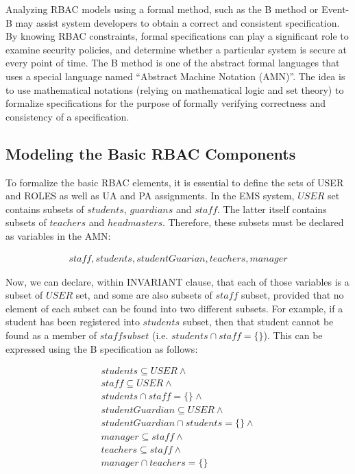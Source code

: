      Analyzing RBAC models using a formal method, such as the B method or Event-B may assist system developers to obtain a correct and consistent specification.  By knowing RBAC constraints, formal specifications can play a significant role to examine security policies, and determine whether a particular system is secure at every point of time.
The B method is one of the abstract formal languages that uses a special language named “Abstract Machine Notation (AMN)”.  The idea is to use mathematical notations (relying on mathematical logic and set theory) to formalize specifications for the purpose of formally verifying correctness and consistency of a specification.

\subsection{Modeling the Basic RBAC Components}

To formalize the basic RBAC elements, it is essential to define the sets of USER and ROLES as well as UA and PA assignments.  In the EMS system, $USER$ set contains subsets of $students$, $guardians$ and $staff$.  The latter itself contains subsets of $teachers$ and $headmasters$.  Therefore, these subsets must be declared as variables in the AMN: 

\begin{align*}
staff, students, studentGuarian, teachers, manager
\end{align*}


Now, we can declare, within INVARIANT clause, that each of those variables is a subset of $USER$ set, and some are also subsets of $staff$ subset, provided that no element of each subset can be found into two different subsets.  For example, if a student has been registered into $students$ subset, then that student cannot be found as a member of $staff subset$ (i.e. $ students \cap staff = \{\}$).  This can be expressed using the B specification as follows:


\begin{align*}
students \subseteq USER  \wedge \\
staff \subseteq USER  \wedge \\
students \cap staff = \{ \}  \wedge \\
studentGuardian \subseteq USER   \wedge \\
studentGuardian\cap students = \{ \}  \wedge \\
manager \subseteq staff   \wedge \\
teachers \subseteq staff   \wedge \\
manager \cap teachers = \{ \} \\ 
\end{align*}



